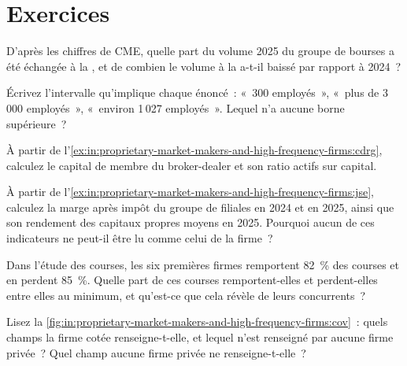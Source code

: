 \section{Exercices}

\begin{exercise}[$\star$]\label{exo:in:proprietary-market-makers-and-high-frequency-firms:1}
D'après les chiffres de CME, quelle part du volume 2025 du groupe de bourses a été échangée à la , et de combien le volume à la  a-t-il
baissé par rapport à 2024~?
\end{exercise}

\begin{exercise}[$\star$]\label{exo:in:proprietary-market-makers-and-high-frequency-firms:2}
Écrivez l'intervalle qu'implique chaque énoncé~: «~300 employés~», «~plus de 3\,000 employés~», «~environ 1\,027
employés~». Lequel n'a aucune borne supérieure~?
\end{exercise}

\begin{exercise}[$\star$]\label{exo:in:proprietary-market-makers-and-high-frequency-firms:3}
À partir de l'\cref{ex:in:proprietary-market-makers-and-high-frequency-firms:cdrg}, calculez le capital de membre du broker-dealer et
son ratio actifs sur capital.
\end{exercise}

\begin{exercise}[$\star\star$]\label{exo:in:proprietary-market-makers-and-high-frequency-firms:4}
À partir de l'\cref{ex:in:proprietary-market-makers-and-high-frequency-firms:jse}, calculez la marge après impôt du groupe de
filiales en 2024 et en 2025, ainsi que son rendement des capitaux propres moyens en 2025. Pourquoi aucun de ces indicateurs ne peut-il être lu comme celui de la firme~?
\end{exercise}

\begin{exercise}[$\star\star$]\label{exo:in:proprietary-market-makers-and-high-frequency-firms:5}
Dans l'étude des courses, les six premières firmes remportent 82~\% des courses et en perdent 85~\%.
Quelle part de ces courses remportent-elles et perdent-elles entre elles au minimum, et qu'est-ce que cela révèle de leurs concurrents~?
\end{exercise}

\begin{exercise}[$\star\star$]\label{exo:in:proprietary-market-makers-and-high-frequency-firms:6}
Lisez la \cref{fig:in:proprietary-market-makers-and-high-frequency-firms:cov}~: quels champs la firme cotée renseigne-t-elle, et lequel n'est renseigné par aucune firme privée~?
Quel champ aucune firme privée ne renseigne-t-elle~?
\end{exercise}

